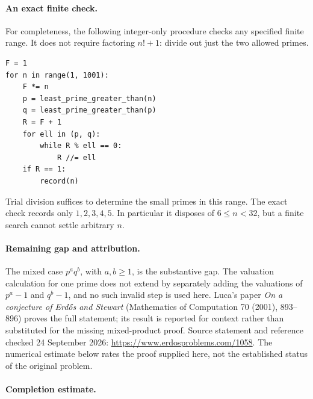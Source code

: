 \paragraph{An exact finite check.}
For completeness, the following integer-only procedure checks any specified finite range. It does not require factoring \(n!+1\): divide out just the two allowed primes.
\begin{verbatim}
F = 1
for n in range(1, 1001):
    F *= n
    p = least_prime_greater_than(n)
    q = least_prime_greater_than(p)
    R = F + 1
    for ell in (p, q):
        while R % ell == 0:
            R //= ell
    if R == 1:
        record(n)
\end{verbatim}
Trial division suffices to determine the small primes in this range. The exact check records only \(1,2,3,4,5\). In particular it disposes of \(6\leq n<32\), but a finite search cannot settle arbitrary \(n\).

\paragraph{Remaining gap and attribution.}
The mixed case \(p^a q^b\), with \(a,b\geq1\), is the substantive gap. The valuation calculation for one prime does not extend by separately adding the valuations of \(p^a-1\) and \(q^b-1\), and no such invalid step is used here. Luca's paper \emph{On a conjecture of Erd\H{o}s and Stewart} (Mathematics of Computation 70 (2001), 893--896) proves the full statement; its result is reported for context rather than substituted for the missing mixed-product proof. Source statement and reference checked 24 September 2026: \url{https://www.erdosproblems.com/1058}. The numerical estimate below rates the proof supplied here, not the established status of the original problem.

\paragraph{Completion estimate.}
